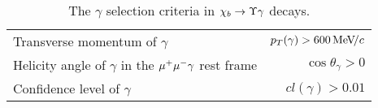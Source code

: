 \begin{table}[H]
\caption{\small The $\gamma$ selection criteria in  $\chi_{{b}} \rightarrow \Upsilon \gamma$ decays.}
\centering
\begin{tabular}{lr}\toprule
Transverse momentum of $\gamma$ & $p_T(\gamma) > 600 {\mathrm{\,Me\kern -0.1em V\!/}c}$ \\
Helicity angle of $\gamma$ in the ${\mu^+\mu^-}\gamma$ rest frame & $\cos\theta_{\gamma} > 0$ \\
Confidence level of $\gamma$ & $cl(\gamma) > 0.01$ \\
\bottomrule
\end{tabular}
\label{tab:chib:selection:photons}
\end{table}